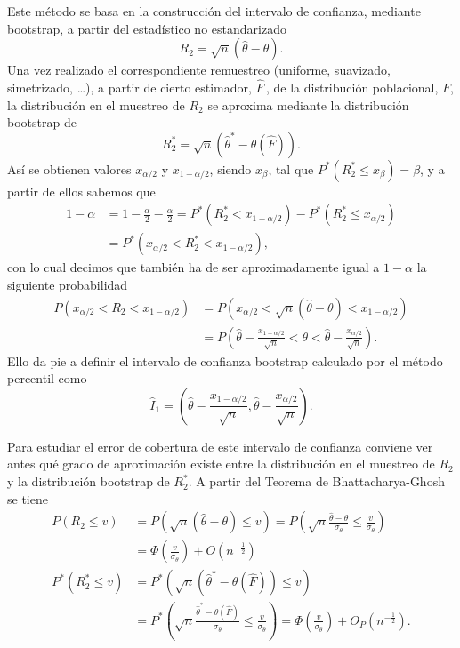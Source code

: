 \documentclass[
]{book}
\theoremstyle{break}
\theoremstyle{nonumberplain}
\begin{document}
Este método se basa en la construcción del intervalo de confianza,
mediante bootstrap, a partir del estadístico no estandarizado
\[R_2=\sqrt{n}\left( \hat{\theta}-\theta \right).\]
Una vez realizado el correspondiente remuestreo (uniforme, suavizado,
simetrizado, \ldots), a partir de cierto estimador, \(\hat{F}\,\), de la
distribución poblacional, \(F\), la distribución en el muestreo de
\(R_2\) se aproxima mediante la distribución bootstrap de
\[R_2^{\ast}=\sqrt{n}\left( \hat{\theta}^{\ast}-\theta \left( \hat{F}
 \right) \right).\]
Así se obtienen valores \(x_{\alpha /2}\) y
\(x_{1-\alpha /2}\), siendo \(x_{\beta }\), tal que
\(P^{\ast}\left( R_2^{\ast }\leq x_{\beta } \right) =\beta\),
y a partir de ellos sabemos que
\[\begin{aligned}
1-\alpha &= 1-\frac{\alpha }{2}-\frac{\alpha }{2}=P^{\ast}\left(
R_2^{\ast}<x_{1-\alpha /2} \right) -P^{\ast}\left( R_2^{\ast}\leq
x_{\alpha /2} \right) \\
&= P^{\ast}\left( x_{\alpha /2}<R_2^{\ast}<x_{1-\alpha /2} \right),
\end{aligned}\]
con lo cual decimos que también ha de ser aproximadamente igual a
\(1-\alpha\) la siguiente probabilidad\[\begin{aligned}
P\left( x_{\alpha /2}<R_2<x_{1-\alpha /2} \right) &= P\left( x_{\alpha /2}<
\sqrt{n}\left( \hat{\theta}-\theta \right) <x_{1-\alpha /2} \right) \\
&= P\left( \hat{\theta}-\frac{x_{1-\alpha /2}}{\sqrt{n}}<\theta <\hat{\theta}
-\frac{x_{\alpha /2}}{\sqrt{n}} \right).\end{aligned}\]
Ello da pie a definir el intervalo de confianza bootstrap calculado
por el método percentil como
\[\hat{I}_1=\left( \hat{\theta}-\frac{x_{1-\alpha /2}}{\sqrt{n}},\hat{\theta}
-\frac{x_{\alpha /2}}{\sqrt{n}} \right).\]

Para estudiar el error de cobertura de este intervalo de confianza
conviene ver antes qué grado de aproximación existe entre la
distribución en el muestreo de \(R_2\) y la distribución bootstrap de
\(R_2^{\ast}\). A partir del Teorema de Bhattacharya-Ghosh se
tiene\[\begin{aligned}
P\left( R_2\leq v \right) &= P\left( \sqrt{n}\left( \hat{\theta}-\theta
 \right) \leq v \right) =P\left( \sqrt{n}\frac{\hat{\theta}-\theta }{\sigma
_{\theta }}\leq \frac{v}{\sigma _{\theta }} \right) \\
&= \Phi \left( \frac{v}{\sigma _{\theta }} \right) +O\left( n^{-\frac{1}{2}
} \right) \\
P^{\ast}\left( R_2^{\ast}\leq v \right) &= P^{\ast}\left( \sqrt{n}\left( 
\hat{\theta}^{\ast}-\theta \left( \hat{F} \right) \right) \leq v \right)
\\
&=  P^{\ast}\left( \sqrt{n}\frac{\hat{\theta}^{\ast}-\theta \left( \hat{F}
 \right)}{\sigma _{\hat{\theta}}}\leq \frac{v}{\sigma _{\hat{\theta}}} \right)
=\Phi \left( \frac{v}{\sigma _{\hat{\theta}}} \right) +O_{P}\left( n^{-
\frac{1}{2}} \right).
\end{aligned}\]
\end{document}
